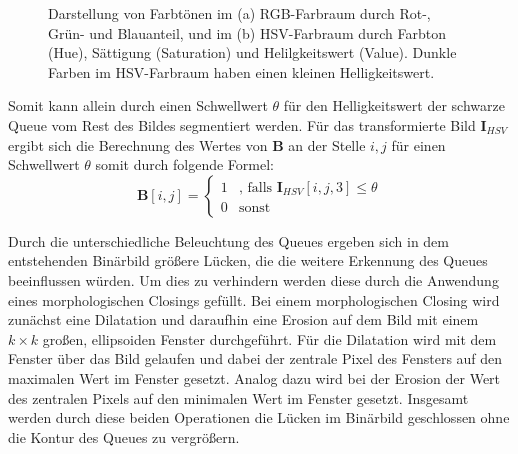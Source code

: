 \begin{figure}[H]
	\label{fig:HSVRGB}
	\centering
	\caption{Darstellung von Farbtönen im (a) RGB-Farbraum \cite{RGBCube} durch Rot-, Grün- und Blauanteil, und im (b) HSV-Farbraum \cite{HSVCylinder} durch Farbton (Hue), Sättigung (Saturation) und Helilgkeitswert (Value). Dunkle Farben im HSV-Farbraum haben einen kleinen Helligkeitswert.}
\end{figure}

Somit kann allein durch einen Schwellwert $\theta$ für den Helligkeitswert der schwarze Queue vom Rest des Bildes segmentiert werden.
Für das transformierte Bild $\textbf{I}_{HSV}$ ergibt sich die Berechnung des Wertes von $\textbf{B}$ an der Stelle $i, j$ für einen Schwellwert $\theta$ somit durch folgende Formel:
\begin{equation*}
\textbf{B}[i,j] = \begin{cases}
1 &\text{, falls $\textbf{I}_{HSV}[i, j, 3] \leq \theta$}\\
0 &\text{sonst}
\end{cases}
\end{equation*}

Durch die unterschiedliche Beleuchtung des Queues ergeben sich in dem entstehenden Binärbild größere Lücken, die die weitere Erkennung des Queues beeinflussen würden.
Um dies zu verhindern werden diese durch die Anwendung eines morphologischen Closings gefüllt.
Bei einem morphologischen Closing wird zunächst eine Dilatation und daraufhin eine Erosion auf dem Bild mit einem $k \times k$ großen, ellipsoiden Fenster durchgeführt. 
Für die Dilatation wird mit dem Fenster über das Bild gelaufen und dabei der zentrale Pixel des Fensters auf den maximalen Wert im Fenster gesetzt.
Analog dazu wird bei der Erosion der Wert des zentralen Pixels auf den minimalen Wert im Fenster gesetzt.
Insgesamt werden durch diese beiden Operationen die Lücken im Binärbild geschlossen ohne die Kontur des Queues zu vergrößern.

